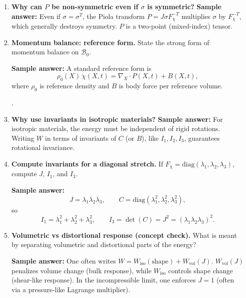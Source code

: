 \documentclass[12pt]{article}
\begin{document}
\begin{enumerate}
\item \textbf{Why can $P$ be non-symmetric even if $\sigma$ is symmetric?}
\textbf{Sample answer:}
Even if $\sigma=\sigma^T$, the Piola transform $P=J\sigma F_\chi^{-T}$ multiplies $\sigma$
by $F_\chi^{-T}$, which generally destroys symmetry. $P$ is a two-point (mixed-index) tensor.

\item \textbf{Momentum balance: reference form.}
State the strong form of momentum balance on $\mathcal{B}_0$.

\textbf{Sample answer:}
A standard reference form is
\[
\rho_0(X)\,\ddot{\chi}(X,t) = \nabla_X\cdot P(X,t) + B(X,t),
\]
where $\rho_0$ is reference density and $B$ is body force per reference volume.

.


\item \textbf{Why use invariants in isotropic materials?}
\textbf{Sample answer:}
For isotropic materials, the energy must be independent of rigid rotations.
Writing $W$ in terms of invariants of $C$ (or $B$), like $I_1,I_2,I_3$, guarantees rotational invariance.

\item \textbf{Compute invariants for a diagonal stretch.}
If $F_\chi=\mathrm{diag}(\lambda_1,\lambda_2,\lambda_3)$, compute $J$, $I_1$, and $I_3$.

\textbf{Sample answer:}
\[
J=\lambda_1\lambda_2\lambda_3,\qquad
C=\mathrm{diag}(\lambda_1^2,\lambda_2^2,\lambda_3^2),
\]
so
\[
I_1=\lambda_1^2+\lambda_2^2+\lambda_3^2,\qquad
I_3=\det(C)=J^2=(\lambda_1\lambda_2\lambda_3)^2.
\]

\item \textbf{Volumetric vs distortional response (concept check).}
What is meant by separating volumetric and distortional parts of the energy?

\textbf{Sample answer:}
One often writes $W=W_{\text{iso}}(\text{shape})+W_{\text{vol}}(J)$.
$W_{\text{vol}}(J)$ penalizes volume change (bulk response), while $W_{\text{iso}}$ controls shape change (shear-like response).
In the incompressible limit, one enforces $J=1$ (often via a pressure-like Lagrange multiplier).



\end{enumerate}
\end{document}
